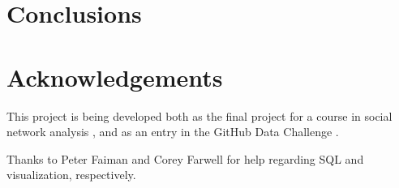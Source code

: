 \documentclass[11pt]{article}
\begin{document}
\section{Conclusions}

\section{Acknowledgements}
This project is being developed both as the final project for a course in social
network analysis \cite{snacourse}, and as an entry in the GitHub Data Challenge
\cite{doll13}.

Thanks to Peter Faiman and Corey Farwell for help regarding SQL and
visualization, respectively.



\end{document}
